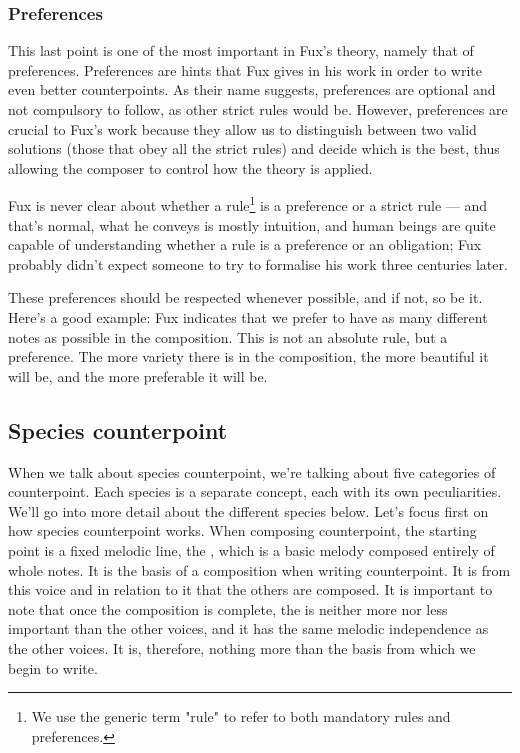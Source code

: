 \subsubsection{Preferences}\label{subsection:preferences-vs-hard-rules}
This last point is one of the most important in Fux's theory, namely that of preferences. Preferences are hints that Fux gives in his work in order to write even better counterpoints. As their name suggests, preferences are optional and not compulsory to follow, as other strict rules would be. However, preferences are crucial to Fux's work because they allow us to distinguish between two valid solutions (those that obey all the strict rules) and decide which is the best, thus allowing the composer to control how the theory is applied.

Fux is never clear about whether a rule\footnote{We use the generic term "rule" to refer to both mandatory rules and preferences.} is a preference or a strict rule --- and that's normal, what he conveys is mostly intuition, and human beings are quite capable of understanding whether a rule is a preference or an obligation; Fux probably didn't expect someone to try to formalise his work three centuries later.

These preferences should be respected whenever possible, and if not, so be it. Here's a good example: Fux indicates that we prefer to have as many different notes as possible in the composition. This is not an absolute rule, but a preference. The more variety there is in the composition, the more beautiful it will be, and the more preferable it will be.

\subsection{Species counterpoint}\label{section:species-counterpoint}
When we talk about species counterpoint, we're talking about five categories of counterpoint. Each species is a separate concept, each with its own peculiarities. We'll go into more detail about the different species below. Let's focus first on how species counterpoint works. When composing counterpoint, the starting point is a fixed melodic line, the \cf, which is a basic melody composed entirely of whole notes. It is the basis of a composition when writing counterpoint. It is from this voice and in relation to it that the others are composed. It is important to note that once the composition is complete, the \cfs is neither more nor less important than the other voices, and it has the same melodic independence as the other voices. It is, therefore, nothing more than the basis from which we begin to write.

